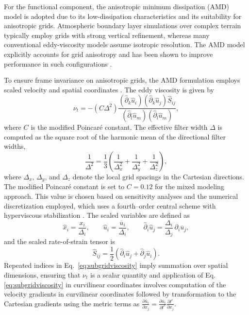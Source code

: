 \documentclass[%
superscriptaddress,
 amsmath,amssymb,
pra,
showkeys,
]{revtex4-2}
\begin{document}
For the functional component, the anisotropic minimum dissipation (AMD) model is adopted due to its low-dissipation characteristics and its suitability for anisotropic grids. Atmospheric boundary layer simulations over complex terrain typically employ grids with strong vertical refinement, whereas many conventional eddy-viscosity models assume isotropic resolution. The AMD model explicitly accounts for grid anisotropy and has been shown to improve performance in such configurations \cite{rozema2015minimum,moser2021statistical}.

To ensure frame invariance on anisotropic grids, the AMD formulation employs scaled velocity and spatial coordinates \cite{verstappen2018much}. The eddy viscosity is given by
\begin{equation}
	\nu_t
	= -\left(C\Delta^2\right)
	\frac{
		\left(\hat{\partial}_k \hat{u}_i\right)
		\left(\hat{\partial}_k \hat{u}_j\right)
		\hat{S}_{ij}
	}{
		\left(\hat{\partial}_l \hat{u}_m\right)
		\left(\hat{\partial}_l \hat{u}_m\right)
	},
	\label{eq:subgridviscosity}
\end{equation}
where $C$ is the modified Poincar\'e constant. The effective filter width $\Delta$ is computed as the square root of the harmonic mean of the directional filter widths,
\begin{equation}
	\frac{1}{\Delta^2}
	= \frac{1}{3}
	\left(
	\frac{1}{\Delta_x^2}
	+ \frac{1}{\Delta_y^2}
	+ \frac{1}{\Delta_z^2}
	\right),
\end{equation}
where $\Delta_x$, $\Delta_y$, and $\Delta_z$ denote the local grid spacings in the Cartesian directions. The modified Poincar\'e constant is set to $C=0.12$ for the mixed modeling approach. This value is chosen based on sensitivity analyses and the numerical discretization employed, which uses a fourth--order central scheme with hyperviscous stabilization \cite{ajay2025mixed}. The scaled variables are defined as
\[
\hat{x}_i = \frac{x_i}{\Delta_i},
\qquad
\hat{u}_i = \frac{\overline{u}_i}{\Delta_i},
\qquad
\hat{\partial}_i \hat{u}_j
= \frac{\Delta_i}{\Delta_j}\,\partial_i \overline{u}_j,
\]
and the scaled rate-of-strain tensor is
\[
\hat{S}_{ij}
= \frac{1}{2}\left(
\hat{\partial}_i \hat{u}_j
+ \hat{\partial}_j \hat{u}_i
\right).
\]
Repeated indices in Eq.~\eqref{eq:subgridviscosity} imply summation over spatial dimensions, ensuring that $\nu_t$ is a scalar quantity and application of Eq. \eqref{eq:subgridviscosity} in curvilinear coordinates involves computation of the velocity gradients in curvilinear coordinates followed by transformation to the Cartesian gradients using the metric terms as $\frac{\partial \overline{u}_i}{\partial x_j} = \frac{\partial \overline{u}_i}{\partial l^r} \frac{\partial l^r}{\partial x_j}$.
\end{document}

